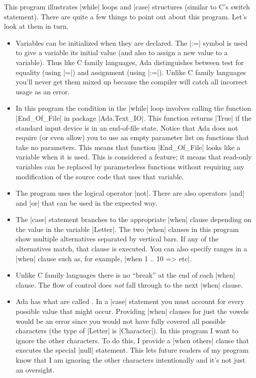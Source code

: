 This program illustrates |while| loops and |case| structures (similar to C's switch statement).
There are quite a few things to point out about this program. Let's look at them in turn.

\begin{itemize}
\item Variables can be initialized when they are declared. The |:=| symbol is used to give a
  variable its initial value (and also to assign a new value to a variable). Thus like C family
  languages, Ada distinguishes between test for equality (using |=|) and assignment (using
  |:=|). Unlike C family languages you'll never get them mixed up because the compiler will
  catch all incorrect usage as an error.

\item In this program the condition in the |while| loop involves calling the function
  |End_Of_File| in package |Ada.Text_IO|. This function returns |True| if the standard input
  device is in an end-of-file state. Notice that Ada does not require (or even allow) you to use
  an empty parameter list on functions that take no parameters. This means that function
  |End_Of_File| looks like a variable when it is used. This is considered a feature; it means
  that read-only variables can be replaced by parameterless functions without requiring any
  modification of the source code that uses that variable.

\item The program uses the logical operator |not|. There are also operators |and| and |or| that
  can be used in the expected way.

\item The |case| statement branches to the appropriate |when| clause depending on the value in
  the variable |Letter|. The two |when| clauses in this program show multiple alternatives
  separated by vertical bars. If any of the alternatives match, that clause is executed. You can
  also specify ranges in a |when| clause such as, for example, |when 1 .. 10 => etc|.

\item Unlike C family languages there is no ``break'' at the end of each |when| clause. The flow
  of control does \emph{not} fall through to the next |when| clause.

\item Ada has what are called . In a |case| statement you must
  account for every possible value that might occur. Providing |when| clauses for just the
  vowels would be an error since you would not have fully covered all possible characters (the
  type of |Letter| is |Character|). In this program I want to ignore the other characters. To do
  this, I provide a |when others| clause that executes the special |null| statement. This lets
  future readers of my program know that I am ignoring the other characters intentionally and
  it's not just an oversight.


\end{itemize}
